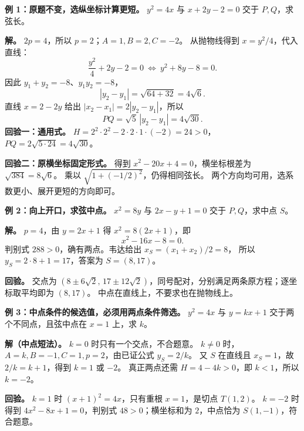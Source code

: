 \begin{examplebox}
\textbf{例 1：原题不变，选纵坐标计算更短。}
$y^2=4x$ 与 $x+2y-2=0$ 交于 $P,Q$，求弦长。

\textbf{解。} $2p=4$，所以 $p=2$；$A=1,B=2,C=-2$。
从抛物线得到 $x=y^2/4$，代入直线：
\[
 \frac{y^2}{4}+2y-2=0
 \ \Longleftrightarrow\ y^2+8y-8=0.
\]
因此 $y_1+y_2=-8$、$y_1y_2=-8$，
\[
 |y_2-y_1|=\sqrt{64+32}=4\sqrt6.
\]
直线 $x=2-2y$ 给出 $|x_2-x_1|=2|y_2-y_1|$，所以
\[
 PQ=\sqrt5\,|y_2-y_1|=\boxed{4\sqrt{30}}.
\]
\textbf{回验一：通用式。} $H=2^2\cdot2^2-2\cdot2\cdot1\cdot(-2)=24>0$，
$PQ=2\sqrt{5\cdot24}=4\sqrt{30}$。

\textbf{回验二：原横坐标固定形式。} 得到 $x^2-20x+4=0$，横坐标根差为 $\sqrt{384}=8\sqrt6$。
乘以 $\sqrt{1+(-1/2)^2}$，仍得相同弦长。
两个方向均可用，选系数更小、展开更短的方向即可。
\end{examplebox}
\clearpage
\begin{examplebox}
\textbf{例 2：向上开口，求弦中点。}
$x^2=8y$ 与 $2x-y+1=0$ 交于 $P,Q$，求中点 $S$。

\textbf{解。} $p=4$，由 $y=2x+1$ 得 $x^2=8(2x+1)$，即
\[
 x^2-16x-8=0.
\]
判别式 $288>0$，确有两点。韦达给出 $x_S=(x_1+x_2)/2=8$，
所以 $y_S=2\cdot8+1=17$，答案为 $\boxed{S=(8,17)}$。

\textbf{回验。} 交点为 $(8\pm6\sqrt2,\,17\pm12\sqrt2)$，同号配对，分别满足两条原方程；逐坐标取平均即为 $(8,17)$。
中点在直线上，不要求也在抛物线上。
\end{examplebox}
\clearpage
\begin{examplebox}
\textbf{例 3：中点条件的候选值，必须用两点条件筛选。}
$y^2=4x$ 与 $y=kx+1$ 交于两个不同点，且弦中点在 $x=1$ 上，求 $k$。

\textbf{解（中点短法）。} $k=0$ 时只有一个交点，不合题意。
$k\ne0$ 时，$A=k,B=-1,C=1,p=2$，由已证公式 $y_S=2/k$。
又 $S$ 在直线且 $x_S=1$，故 $2/k=k+1$，得到 $k=1$ 或 $-2$。
真正两点还需 $H=4-4k>0$，即 $k<1$，所以 $\boxed{k=-2}$。

\textbf{回验。} $k=1$ 时 $(x+1)^2=4x$，只有重根 $x=1$，是切点 $T(1,2)$。
$k=-2$ 时得到 $4x^2-8x+1=0$，判别式 $48>0$；横坐标和为 $2$，中点恰为 $S(1,-1)$，符合题意。
\end{examplebox}
\clearpage
